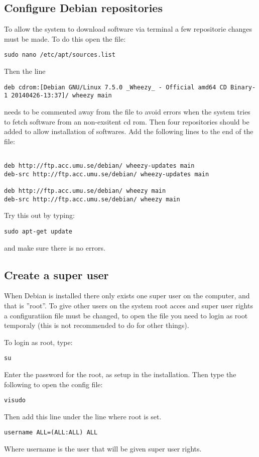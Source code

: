 \subsection{Configure Debian repositories}
To allow the system to download software via terminal a few repositorie changes must be made.
To do this open the file:
\begin{verbatim}
sudo nano /etc/apt/sources.list
\end{verbatim}
Then the line
\begin{verbatim}
deb cdrom:[Debian GNU/Linux 7.5.0 _Wheezy_ - Official amd64 CD Binary-1 20140426-13:37]/ wheezy main
\end{verbatim}
needs to be commented away from the file to avoid errors when the system tries to fetch software from an non-exsitent cd rom. Then four repositories should be added to allow installation of softwares. Add the following lines to the end of the file:
\begin{verbatim}

deb http://ftp.acc.umu.se/debian/ wheezy-updates main
deb-src http://ftp.acc.umu.se/debian/ wheezy-updates main

deb http://ftp.acc.umu.se/debian/ wheezy main
deb-src http://ftp.acc.umu.se/debian/ wheezy main
\end{verbatim}
Try this out by typing:
\begin{verbatim}
sudo apt-get update
\end{verbatim}
and make sure there is no errors.

\subsection{Create a super user}
When Debian is installed there only exists one super user on the computer, and that is ''root''. To give other users on the system root acces and super user rights a configuratiion file must be changed, to open the file you need to login as root temporaly (this is not recommended to do for other things).

To login as root, type:
\begin{verbatim}
su
\end{verbatim}
Enter the password for the root, as setup in the installation. Then type the following to open the config file:
\begin{verbatim}
visudo
\end{verbatim}
Then add this line under the line where root is set.
\begin{verbatim}
username ALL=(ALL:ALL) ALL
\end{verbatim}
Where username is the user that will be given super user rights.

